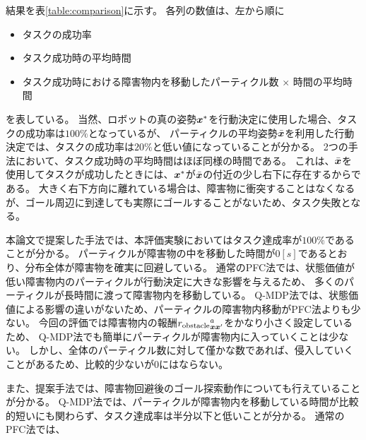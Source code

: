 結果を表\ref{table:comparison}に示す。
各列の数値は、左から順に
\begin{itemize}
  \item タスクの成功率
  \item タスク成功時の平均時間
  \item タスク成功時における障害物内を移動したパーティクル数 $\times$ 時間の平均時間
\end{itemize}
を表している。
当然、ロボットの真の姿勢$\boldsymbol{x}^{*}$を行動決定に使用した場合、タスクの成功率は$100\%$となっているが、
パーティクルの平均姿勢$\bar{\boldsymbol{x}}$を利用した行動決定では、タスクの成功率は$20\%$と低い値になっていることが分かる。
2つの手法において、タスク成功時の平均時間はほぼ同様の時間である。
これは、$\bar{\boldsymbol{x}}$を使用してタスクが成功したときには、$\boldsymbol{x}^{*}$が$\bar{\boldsymbol{x}}$の付近の少し右下に存在するからである。
大きく右下方向に離れている場合は、障害物に衝突することはなくなるが、ゴール周辺に到達しても実際にゴールすることがないため、タスク失敗となる。

本論文で提案した手法では、本評価実験においてはタスク達成率が$100\%$であることが分かる。
パーティクルが障害物の中を移動した時間が$0[\si{s}]$であるとおり、分布全体が障害物を確実に回避している。
通常のPFC法では、状態価値が低い障害物内のパーティクルが行動決定に大きな影響を与えるため、
多くのパーティクルが長時間に渡って障害物内を移動している。
Q-MDP法では、状態価値による影響の違いがないため、パーティクルの障害物内移動がPFC法よりも少ない。
今回の評価では障害物内の報酬${r_{\rm obstacle}}^{a}_{\bm{x}\bm{x}^{\prime}}$をかなり小さく設定しているため、
Q-MDP法でも簡単にパーティクルが障害物内に入っていくことは少ない。
しかし、全体のパーティクル数に対して僅かな数であれば、侵入していくことがあるため、比較的少ないが$0$にはならない。

また、提案手法では、障害物回避後のゴール探索動作についても行えていることが分かる。
Q-MDP法では、パーティクルが障害物内を移動している時間が比較的短いにも関わらず、タスク達成率は半分以下と低いことが分かる。
通常のPFC法では、

